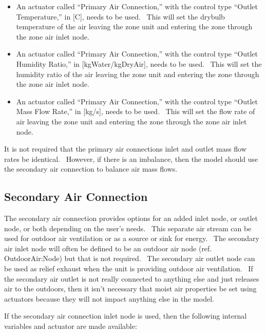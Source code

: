 \begin{itemize}
\item
  An actuator called ``Primary Air Connection,'' with the control type ``Outlet Temperature,'' in {[}C{]}, needs to be used.~ This will set the drybulb temperature of the air leaving the zone unit and entering the zone through the zone air inlet node.
\item
  An actuator called ``Primary Air Connection,'' with the control type ``Outlet Humidity Ratio,'' in {[}kgWater/kgDryAir{]}, needs to be used.~ This will set the humidity ratio of the air leaving the zone unit and entering the zone through the zone air inlet node.
\item
  An actuator called ``Primary Air Connection,'' with the control type ``Outlet Mass Flow Rate,'' in {[}kg/s{]}, needs to be used.~ This will set the flow rate of air leaving the zone unit and entering the zone through the zone air inlet node.
\end{itemize}

It is not required that the primary air connections inlet and outlet mass flow rates be identical.~ However, if there is an imbalance, then the model should use the secondary air connection to balance air mass flows.

\subsection{Secondary Air Connection}\label{secondary-air-connection-000}

The secondary air connection provides options for an added inlet node, or outlet node, or both depending on the user's needs.~ This separate air stream can be used for outdoor air ventilation or as a source or sink for energy.~ The secondary air inlet node will often be defined to be an outdoor air node (ref. OutdoorAir:Node) but that is not required.~ The secondary air outlet node can be used as relief exhaust when the unit is providing outdoor air ventilation.~ If the secondary air outlet is not really connected to anything else and just releases air to the outdoors, then it isn't necessary that moist air properties be set using actuators because they will not impact anything else in the model.

If the secondary air connection inlet node is used, then the following internal variables and actuator are made available:

